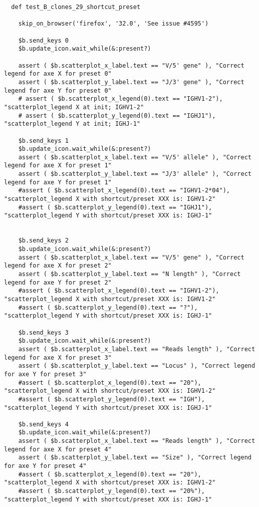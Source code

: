 \begin{verbatim}
  def test_B_clones_29_shortcut_preset

    skip_on_browser('firefox', '32.0', 'See issue #4595')

    $b.send_keys 0
    $b.update_icon.wait_while(&:present?)

    assert ( $b.scatterplot_x_label.text == "V/5' gene" ), "Correct legend for axe X for preset 0"
    assert ( $b.scatterplot_y_label.text == "J/3' gene" ), "Correct legend for axe Y for preset 0"
    # assert ( $b.scatterplot_x_legend(0).text == "IGHV1-2"), "scatterplot_legend X at init; IGHV1-2"
    # assert ( $b.scatterplot_y_legend(0).text == "IGHJ1"), "scatterplot_legend Y at init; IGHJ-1"

    $b.send_keys 1
    $b.update_icon.wait_while(&:present?)
    assert ( $b.scatterplot_x_label.text == "V/5' allele" ), "Correct legend for axe X for preset 1"
    assert ( $b.scatterplot_y_label.text == "J/3' allele" ), "Correct legend for axe Y for preset 1"
    #assert ( $b.scatterplot_x_legend(0).text == "IGHV1-2*04"), "scatterplot_legend X with shortcut/preset XXX is: IGHV1-2"
    #assert ( $b.scatterplot_y_legend(0).text == "IGHJ1"), "scatterplot_legend Y with shortcut/preset XXX is: IGHJ-1"


    $b.send_keys 2
    $b.update_icon.wait_while(&:present?)
    assert ( $b.scatterplot_x_label.text == "V/5' gene" ), "Correct legend for axe X for preset 2"
    assert ( $b.scatterplot_y_label.text == "N length" ), "Correct legend for axe Y for preset 2"
    #assert ( $b.scatterplot_x_legend(0).text == "IGHV1-2"), "scatterplot_legend X with shortcut/preset XXX is: IGHV1-2"
    #assert ( $b.scatterplot_y_legend(0).text == "?"), "scatterplot_legend Y with shortcut/preset XXX is: IGHJ-1"

    $b.send_keys 3
    $b.update_icon.wait_while(&:present?)
    assert ( $b.scatterplot_x_label.text == "Reads length" ), "Correct legend for axe X for preset 3"
    assert ( $b.scatterplot_y_label.text == "Locus" ), "Correct legend for axe Y for preset 3"
    #assert ( $b.scatterplot_x_legend(0).text == "20"), "scatterplot_legend X with shortcut/preset XXX is: IGHV1-2"
    #assert ( $b.scatterplot_y_legend(0).text == "IGH"), "scatterplot_legend Y with shortcut/preset XXX is: IGHJ-1"

    $b.send_keys 4
    $b.update_icon.wait_while(&:present?)
    assert ( $b.scatterplot_x_label.text == "Reads length" ), "Correct legend for axe X for preset 4"
    assert ( $b.scatterplot_y_label.text == "Size" ), "Correct legend for axe Y for preset 4"
    #assert ( $b.scatterplot_x_legend(0).text == "20"), "scatterplot_legend X with shortcut/preset XXX is: IGHV1-2"
    #assert ( $b.scatterplot_y_legend(0).text == "20%"), "scatterplot_legend Y with shortcut/preset XXX is: IGHJ-1"


\end{verbatim}
